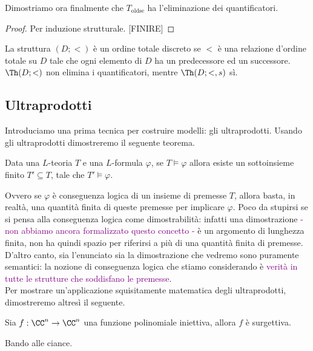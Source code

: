 Dimostriamo ora finalmente che $T_{\text{oldse}}$ ha l'eliminazione dei quantificatori.

\begin{proof}
    Per induzione strutturale. [FINIRE]
\end{proof}

\begin{exercise}
    La struttura $(D;<)$ è un ordine totale discreto se $<$ è una relazione d'ordine totale su $D$ tale che ogni elemento di $D$ ha un predecessore ed un successore.
    $\Th(D;<)$ non elimina i quantificatori, mentre $\Th(D;<,s)$ sì.
\end{exercise}

\subsection{Ultraprodotti}
Introduciamo una prima tecnica per costruire modelli: gli ultraprodotti. Usando gli ultraprodotti dimostreremo il seguente teorema.

\begin{theorem}
    Data una $L$-teoria $T$ e una $L$-formula $\varphi$, se $T \models \varphi$ allora esiste un sottoinsieme finito $T' \subseteq T$,
    tale che $T' \models \varphi$.
\end{theorem}

Ovvero se $\varphi$ è conseguenza logica di un insieme di premesse $T$, allora basta, in realtà, una quantità finita di queste premesse per implicare $\varphi$.
Poco da stupirsi se si pensa alla conseguenza logica come dimostrabilità: infatti una dimostrazione \textcolor{purple}{- non abbiamo ancora formalizzato questo concetto -} è 
un argomento di lunghezza finita, non ha quindi spazio per riferirsi a più di una quantità finita di premesse. D'altro canto, sia l'enunciato sia la dimostrazione che vedremo sono puramente semantici:
la nozione di conseguenza logica che stiamo considerando è \textcolor{purple}{verità in tutte le strutture che soddisfano le premesse}.\\
Per mostrare un'applicazione squisitamente matematica degli ultraprodotti, dimostreremo altresì il seguente.

\begin{theorem}
    [Ax-Grothendieck]
    Sia $f : \CC^n \to \CC^n$ una funzione polinomiale iniettiva, allora $f$ è surgettiva.
\end{theorem}

Bando alle ciance.

